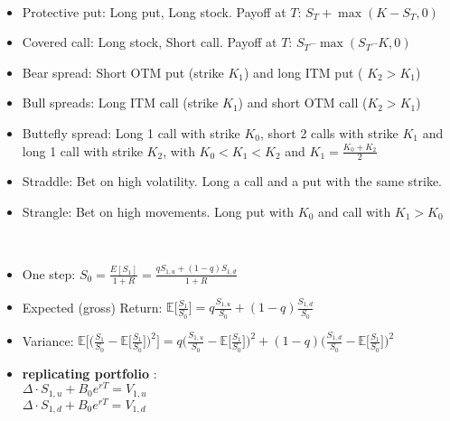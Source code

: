 \documentclass[10pt,landscape,a4paper]{article}
\begin{document}
\begin{multicols*}{3}
  
 \begin{description}[topsep=0pt]
 	\item[Option Strategies] ~
 	\begin{itemize}[topsep=0pt]
 		\item Protective put:  Long put, Long stock. Payoff at  $T$: $ S_T + \operatorname{max}(K-S_T , 0) $
 		\item Covered call: Long stock, Short call.  Payoff at $T$: $ S_T – \operatorname{max}(S_T – K, 0) $
 		\item Bear spread: Short OTM put (strike $K_1$) and long ITM put ( $K_2 > K_1$)
 		\item Bull spreads: Long ITM call (strike $K_1$) and short OTM call ($ K_2 > K_1$)
 		\item Buttefly spread: Long 1 call with strike $K_0$, short 2 calls with strike $K_1$ and long 1 call with strike $K_2$, with $K_0<K_1<K_2$ and $K_1=\frac{K_0+K_2}{2}$
 		\item Straddle: Bet on high volatility. Long a call and a put with the same strike.
 		\item Strangle: Bet on high movements. Long put with $K_0$ and call with $K_1>K_0$ 
 		
 		
 	\end{itemize}
 \end{description}
 
 
  \begin{description}[topsep=0pt]
 	\item[Binomial trees] ~
 	\begin{itemize}[topsep=0pt]
 		\item One step: $S_0=\frac{E[S_1]}{1+R} = \frac{q S_{1,u}+(1-q)S_{1,d}}{1+R}$
 		\item Expected (gross) Return: $\mathbb{E}\Big[\frac{S_1}{S_0}\Big]=q \frac{S_{1,u}}{S_0}+(1-q)\frac{S_{1,d}}{S_0}$
 		\item Variance: $\mathbb{E}\Big[ \Big(\frac{S_1}{S_0} - \mathbb{E}\big[\frac{S_1}{S_0}\big] \Big)^2\Big]=q \Big(\frac{S_{1,u}}{S_0} -\mathbb{E}\big[\frac{S_1}{S_0}\big]\Big)^2+(1-q) \Big(\frac{S_{1,d}}{S_0}-\mathbb{E}\big[\frac{S_1}{S_0}\big]\Big)^2$
 		\item \textbf{replicating portfolio} :\\
 		$\Delta \cdot  S_{1,u} + B_0 e^{rT} = V_{1,u}$ \\
 		$\Delta \cdot  S_{1,d} + B_0 e^{rT} = V_{1,d}$
 		

\end{itemize}
\end{description}
\end{multicols*}
\end{document}
